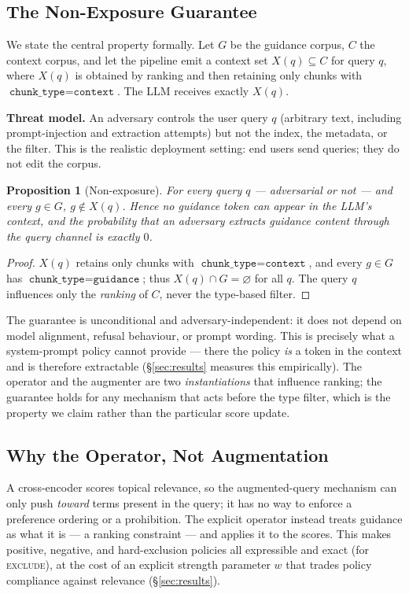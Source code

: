 \documentclass[11pt]{article}
\newtheorem{proposition}{Proposition}
\begin{document}
\subsection{The Non-Exposure Guarantee}
\label{sec:nonexposure}
We state the central property formally. Let $G$ be the guidance corpus, $C$ the context corpus,
and let the pipeline emit a context set $X(q) \subseteq C$ for query $q$, where $X(q)$ is
obtained by ranking and then retaining only chunks with $\texttt{chunk\_type}=\texttt{context}$.
The LLM receives exactly $X(q)$.

\textbf{Threat model.} An adversary controls the user query $q$ (arbitrary text, including
prompt-injection and extraction attempts) but not the index, the metadata, or the filter. This
is the realistic deployment setting: end users send queries; they do not edit the corpus.

\begin{proposition}[Non-exposure]
For every query $q$ --- adversarial or not --- and every $g \in G$, $g \notin X(q)$. Hence no
guidance token can appear in the LLM's context, and the probability that an adversary extracts
guidance content through the query channel is exactly $0$.
\end{proposition}

\begin{proof}
$X(q)$ retains only chunks with $\texttt{chunk\_type}=\texttt{context}$, and every $g\in G$ has
$\texttt{chunk\_type}=\texttt{guidance}$; thus $X(q)\cap G=\varnothing$ for all $q$. The query
$q$ influences only the \emph{ranking} of $C$, never the type-based filter.
\end{proof}

The guarantee is unconditional and adversary-independent: it does not depend on model alignment,
refusal behaviour, or prompt wording. This is precisely what a system-prompt policy cannot
provide --- there the policy \emph{is} a token in the context and is therefore extractable
(\S\ref{sec:results} measures this empirically). The operator and the augmenter are two
\emph{instantiations} that influence ranking; the guarantee holds for any mechanism that acts
before the type filter, which is the property we claim rather than the particular score update.

\subsection{Why the Operator, Not Augmentation}
A cross-encoder scores topical relevance, so the augmented-query mechanism can only push
\emph{toward} terms present in the query; it has no way to enforce a preference ordering or a
prohibition. The explicit operator instead treats guidance as what it is --- a ranking
constraint --- and applies it to the scores. This makes positive, negative, and hard-exclusion
policies all expressible and exact (for \textsc{exclude}), at the cost of an explicit
strength parameter $w$ that trades policy compliance against relevance (\S\ref{sec:results}).
\end{document}

